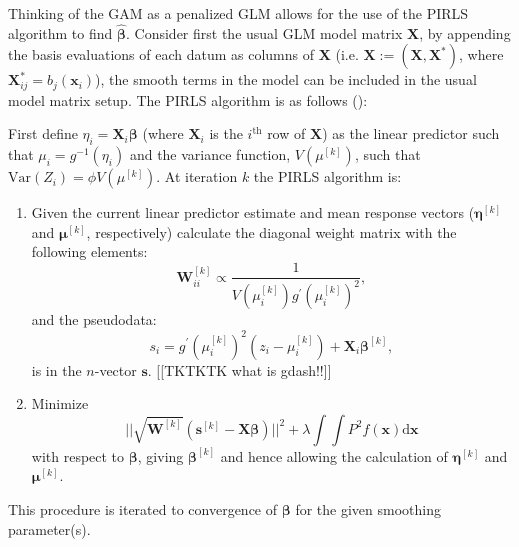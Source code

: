 Thinking of the GAM as a penalized GLM allows for the use of the PIRLS algorithm to find $\bm{\hat{\beta}}$. Consider first the usual GLM model matrix $\mathbf{X}$, by appending the basis evaluations of each datum as columns of $\mathbf{X}$ (i.e. $\mathbf{X}:=\left ( \mathbf{X},\mathbf{X}^* \right )$, where $\mathbf{X}^*_{ij} = b_j(\mathbf{x}_i)$), the smooth terms in the model can be included in the usual model matrix setup. The PIRLS algorithm is as follows (\cite[p. 138]{simonbook}):

First define $\eta_i = \mathbf{X}_i\bm{\beta}$ (where $\mathbf{X}_i$ is the $i^\text{th}$ row of $\mathbf{X}$) as the linear predictor such that $\mu_i = g^{-1}(\eta_i)$ and the variance function, $V(\mu^{[k]})$, such that $\text{Var}\left ( Z_i \right ) = \phi V(\mu^{[k]})$. At iteration $k$ the PIRLS algorithm is:
\begin{enumerate}
\item Given the current linear predictor estimate and mean response vectors ($\bm{\eta}^{[k]}$ and $\bm{\mu}^{[k]}$, respectively) calculate the diagonal weight matrix with the following elements:
\begin{equation*}
\mathbf{W}^{[k]}_{ii}  \propto \frac{1}{V(\mu_i^{[k]})g^\prime(\mu_i^{[k]})^2},
\end{equation*}
and the pseudodata:
\begin{equation*}
s_i = g^\prime(\mu_i^{[k]})^2(z_i-\mu_i^{[k]}) + \mathbf{X}_i\bm{\beta}^{[k]},
\end{equation*}
is in the $n$-vector $\mathbf{s}$. [[TKTKTK what is gdash!!]]
\item Minimize
\begin{equation*}
\lvert \lvert \sqrt{\mathbf{W}^{[k]}} (\mathbf{s}^{[k]} - \mathbf{X}\bm{\beta})  \rvert \rvert^2 + \lambda \int\int P^2 f(\mathbf{x}) \text{d}\mathbf{x}
\end{equation*}
with respect to $\bm{\beta}$, giving $\bm{\beta}^{[k]}$ and hence allowing the calculation of $\bm{\eta}^{[k]}$ and $\bm{\mu}^{[k]}$.
\end{enumerate}
This procedure is iterated to convergence of $\bm{\beta}$ for the given smoothing parameter(s).

